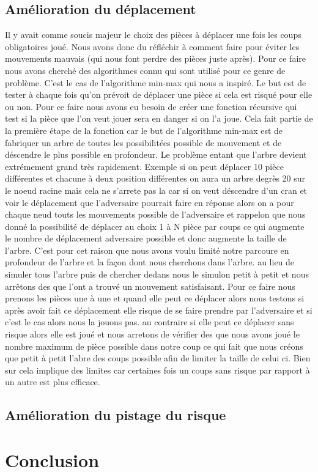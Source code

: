 \documentclass[11pt]{article} %
\begin{document}
\subsection{Amélioration du déplacement}
Il y avait comme soucis majeur le choix des pièces à déplacer une fois les coups obligatoires joué. Nous avons donc du réfléchir à comment faire pour éviter les mouvements mauvais (qui nous font perdre des pièces juste après). Pour ce faire nous avons cherché des algorithmes connu qui sont utilisé pour ce genre de problème. C'est le cas de l'algorithme min-max qui nous a inspiré. Le but est de tester à chaque fois qu'on prévoit de déplacer une pièce si cela est risqué pour elle ou non. Pour ce faire nous avons eu besoin de créer une fonction récursive qui test si la pièce que l'on veut jouer sera en danger si on l'a joue. Cela fait partie de la première étape de la fonction car le but de l'algorithme min-max est de fabriquer un arbre de toutes les possibilitées possible de mouvement et de déscendre le plus possible en profondeur. Le problème entant que l'arbre devient extrémement grand très rapidement. Exemple si on peut déplacer 10 pièce différentes et chacune à deux position différentes on aura un arbre degrès 20 sur le noeud racine mais cela ne s'arrete pas la car si on veut déscendre d'un cran et voir le déplacement que l'adversaire pourrait faire en réponse alors on a pour chaque neud touts les mouvements possible de l'adversaire et rappelon que nous donné la possibilité de déplacer au choix 1 à N pièce par coups ce qui augmente le nombre de déplacement adversaire possible et donc augmente la taille de l'arbre. C'est pour cet raison que nous avons voulu limité notre parcoure en profondeur de l'arbre et la façon dont nous cherchons dans l'arbre. au lieu de simuler tous l'arbre puis de chercher dedans nous le simulon petit à petit et nous arrêtons des que l'ont a trouvé un mouvement satisfaisant. Pour ce faire nous prenons les pièces une à une et quand elle peut ce déplacer alors nous testons si après avoir fait ce déplacement elle risque de se faire prendre par l'adversaire et si c'est le cas alors nous la jouons pas. au contraire si elle peut ce déplacer sans risque alors elle est joué et nous arretons de vérifier des que nous avons joué le nombre maximum de pièce possible dans notre coup ce qui fait que nous créons que petit à petit l'abre des coups possible afin de limiter la taille de celui ci. Bien sur cela implique des limites car certaines fois un coups sans risque par rapport à un autre est plus efficace.

\subsection{Amélioration du pistage du risque}


\section{Conclusion}
\end{document}
